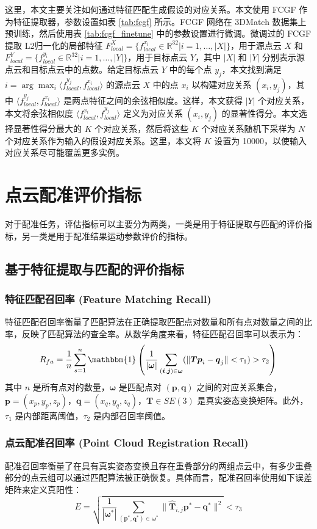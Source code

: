 这里，本文主要关注如何通过特征匹配生成假设的对应关系。本文使用 FCGF 作为特征提取器，参数设置如表 \ref{tab:fcgf} 所示。FCGF 网络在 3DMatch 数据集上预训练，然后使用表 \ref{tab:fcgf_finetune} 中的参数设置进行微调。微调过的 FCGF 提取 L2归一化的局部特征 $F_{local}^X = \{f_{local}^{x_i} \in \mathbb{R}^{32} | i = 1, \dots, |X|\}$，用于源点云 $X$ 和 $F_{local}^Y = \{f_{local}^{y_i} \in \mathbb{R}^{32} | i = 1, \dots, |Y|\}$，用于目标点云 $Y$，其中 $|X|$ 和 $|Y|$ 分别表示源点云和目标点云中的点数。给定目标点云 $Y$ 中的每个点 $y_j$，本文找到满足 $i = \arg\max_i \langle f_{local}^{y_j}, f_{local}^{x_i} \rangle$ 的源点云 $X$ 中的点 $x_i$ 以构建对应关系 $(x_i, y_j)$，其中 $\langle f_{local}^{y_j}, f_{local}^{x_i} \rangle$ 是两点特征之间的余弦相似度。这样，本文获得 $|Y|$ 个对应关系，本文将余弦相似度 $\langle f_{local}^{x_i}, f_{local}^{y_j} \rangle$ 定义为对应关系 $(x_i, y_j)$ 的显著性得分。本文选择显著性得分最大的 $K$ 个对应关系，然后将这些 $K$ 个对应关系随机下采样为 $N$ 个对应关系作为输入的假设对应关系。这里，本文将 $K$ 设置为 10000，以使输入对应关系尽可能覆盖更多实例。
\section{点云配准评价指标}
对于配准任务，评估指标可以主要分为两类，一类是用于特征提取与匹配的评价指标，另一类是用于配准结果运动参数评价的指标。
\subsection{基于特征提取与匹配的评价指标}
\subsubsection{特征匹配召回率 (Feature Matching Recall)}
特征匹配召回率衡量了匹配算法在正确提取匹配点对数量和所有点对数量之间的比率，反映了匹配算法的查全率。从数学角度来看，特征匹配召回率可以表示为：
\begin{equation}
R_{fa} = \frac{1}{n} \sum_{s=1}^{n} \mathbbm{1} \left( \frac{1}{|\boldsymbol{\omega}|} \sum_{(\boldsymbol{i},\boldsymbol{j})\in\boldsymbol{\omega}} (\lVert \boldsymbol{T}\boldsymbol{p}_i - \boldsymbol{q}_j \rVert < \tau_1) > \tau_2 \right)
\end{equation}
其中 $n$ 是所有点对的数量，$\boldsymbol{\omega}$ 是匹配点对 $(\boldsymbol{p}, \boldsymbol{q})$ 之间的对应关系集合，$\boldsymbol{p} = (x_p, y_p, z_p)$，$\boldsymbol{q} = (x_q, y_q, z_q)$，$\boldsymbol{T} \in SE(3)$ 是真实姿态变换矩阵。此外，$\tau_1$ 是内部距离阈值，$\tau_2$ 是内部召回率阈值。
\subsubsection{点云配准召回率 (Point Cloud Registration Recall)}
配准召回率衡量了在具有真实姿态变换且存在重叠部分的两组点云中，有多少重叠部分的点云组可以通过匹配算法被正确恢复。具体而言，配准召回率使用如下误差矩阵来定义真阳性：
\begin{equation}
    E = \sqrt{\frac{1}{|\boldsymbol{\omega}^*|} \sum_{(\boldsymbol{p}^*,\boldsymbol{q}^*)\in\boldsymbol{\omega}^*} \lVert \boldsymbol{\hat{T}}_{i,j}\boldsymbol{p}^* - \boldsymbol{q}^* \rVert^2} < \tau_3
\end{equation}
    

